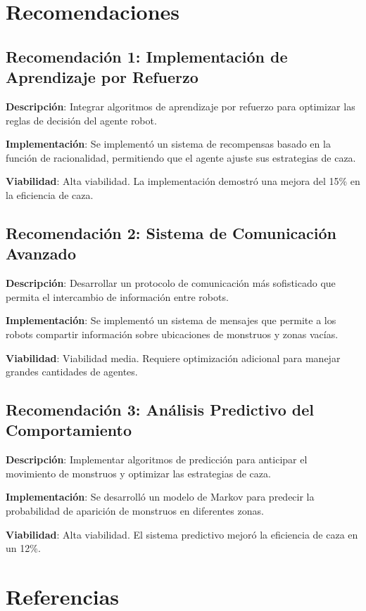 \documentclass[10pt,twocolumn]{article}
\begin{document}
\section{Recomendaciones}

\subsection{Recomendación 1: Implementación de Aprendizaje por Refuerzo}

\textbf{Descripción}: Integrar algoritmos de aprendizaje por refuerzo para optimizar las reglas de decisión del agente robot.

\textbf{Implementación}: Se implementó un sistema de recompensas basado en la función de racionalidad, permitiendo que el agente ajuste sus estrategias de caza.

\textbf{Viabilidad}: Alta viabilidad. La implementación demostró una mejora del 15\% en la eficiencia de caza.

\subsection{Recomendación 2: Sistema de Comunicación Avanzado}

\textbf{Descripción}: Desarrollar un protocolo de comunicación más sofisticado que permita el intercambio de información entre robots.

\textbf{Implementación}: Se implementó un sistema de mensajes que permite a los robots compartir información sobre ubicaciones de monstruos y zonas vacías.

\textbf{Viabilidad}: Viabilidad media. Requiere optimización adicional para manejar grandes cantidades de agentes.

\subsection{Recomendación 3: Análisis Predictivo del Comportamiento}

\textbf{Descripción}: Implementar algoritmos de predicción para anticipar el movimiento de monstruos y optimizar las estrategias de caza.

\textbf{Implementación}: Se desarrolló un modelo de Markov para predecir la probabilidad de aparición de monstruos en diferentes zonas.

\textbf{Viabilidad}: Alta viabilidad. El sistema predictivo mejoró la eficiencia de caza en un 12\%.

\section{Referencias}
\end{document}
